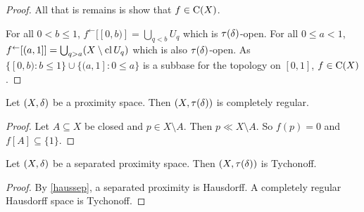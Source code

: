 \begin{proof}
	All that is remains is show that \( f \in \operatorname{C}(X) \).
	
	For all \( 0 < b \leq 1 \), \( f^\leftarrow[[0,b)] = \bigcup_{q<b} U_q \) which is \( \tau(\mathord{\delta}) \)-open.  For all \( 0 \leq a < 1 \), \( f^\leftarrow[(a,1]] = \bigcup_{q > a} (X \setminus \operatorname{cl}{U_q}) \) which is also \( \tau(\mathord{\delta}) \)-open.  As \( \{ [0,b) : b \leq 1 \} \cup \{ (a,1]: 0 \leq a \} \) is a subbase for the topology on \( [0,1] \), \( f \in \operatorname{C}(X) \).
\end{proof}

\begin{corollary}
	Let \( (X,\mathord{\delta}) \) be a proximity space.  Then \( (X,\tau(\mathord{\delta})) \) is completely regular.
\end{corollary}
\begin{proof}
	Let \( A \subseteq X \) be closed and \( p \in X \setminus A \).  Then \( p \ll X \setminus A \).  So \( f(p) = 0 \) and \( f[A] \subseteq \{1\} \).
\end{proof}

\begin{corollary}
	Let \( (X,\mathord{\delta}) \) be a separated proximity space.  Then \( (X,\tau(\mathord{\delta})) \) is Tychonoff.
\end{corollary}
\begin{proof}
	By \ref{haussep}, a separated proximity is Hausdorff.  A completely regular Hausdorff space is Tychonoff.
\end{proof}

